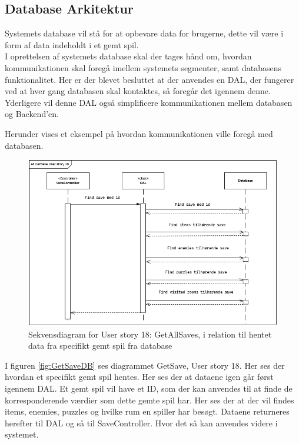 \subsection{Database Arkitektur}
\label{ssec: databaseArkitektur}
Systemets database vil stå for at opbevare data for brugerne, dette vil være i form af data indeholdt i et gemt spil.\\
I oprettelsen af systemets database skal der tages hånd om, hvordan kommunikationen skal foregå imellem systemets segmenter, samt databasens funktionalitet. Her er der blevet besluttet at der anvendes en DAL, der fungerer ved at hver gang databasen skal kontaktes, så foregår det igennem denne. Yderligere vil denne DAL også simplificere kommunikationen mellem databasen og Backend'en. 

\noindent Herunder vises et eksempel på hvordan kommunikationen ville foregå med databasen.

\begin{figure}[H]
\centering
\includegraphics[width = \textwidth]{02-Body/Images/GetSaveDB.PNG}
\caption{Sekvensdiagram for User story 18: GetAllSaves, i relation til hentet data fra specifikt gemt spil fra database}
\label{fig:GetSaveDB}
\end{figure}

\noindent I figuren \autoref{fig:GetSaveDB} ses diagrammet GetSave, User story 18. Her ses der hvordan et specifikt gemt spil hentes. Her ses der at dataene igen går først igennem DAL. Et gemt spil vil have et ID, som der kan anvendes til at finde de korresponderende værdier som dette gemte spil har. Her ses der at der vil findes items, enemies, puzzles og hvilke rum en spiller har besøgt. Dataene returneres herefter til DAL og så til SaveController. Hvor det så kan anvendes videre i systemet.\\

